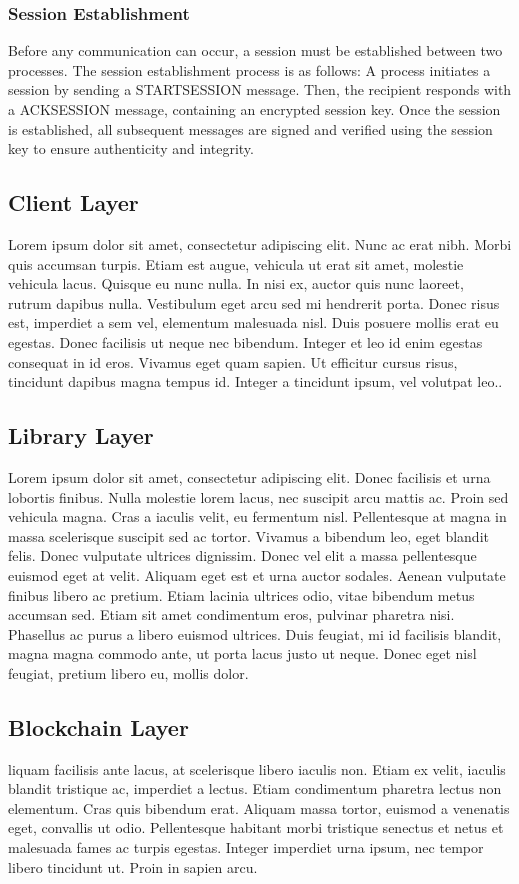 \documentclass[runningheads]{llncs}
\begin{document}
\subsubsection{Session Establishment}

Before any communication can occur, a session must be established between two
processes. The session establishment process is as follows: A process initiates
a session by sending a STARTSESSION message. Then, the recipient responds with a
ACKSESSION message, containing an encrypted session key. Once the session is
established, all subsequent messages are signed and verified using the session
key to ensure authenticity and integrity.
%
\subsection{Client Layer}
Lorem ipsum dolor sit amet, consectetur adipiscing elit. Nunc ac erat nibh.
Morbi quis accumsan turpis. Etiam est augue, vehicula ut erat sit amet, molestie
vehicula lacus. Quisque eu nunc nulla. In nisi ex, auctor quis nunc laoreet,
rutrum dapibus nulla. Vestibulum eget arcu sed mi hendrerit porta. Donec risus
est, imperdiet a sem vel, elementum malesuada nisl. Duis posuere mollis erat eu
egestas. Donec facilisis ut neque nec bibendum. Integer et leo id enim egestas
consequat in id eros. Vivamus eget quam sapien. Ut efficitur cursus risus,
tincidunt dapibus magna tempus id. Integer a tincidunt ipsum, vel volutpat leo..
%
\subsection{Library Layer}
Lorem ipsum dolor sit amet, consectetur adipiscing elit. Donec facilisis et urna
lobortis finibus. Nulla molestie lorem lacus, nec suscipit arcu mattis ac. Proin
sed vehicula magna. Cras a iaculis velit, eu fermentum nisl. Pellentesque at
magna in massa scelerisque suscipit sed ac tortor. Vivamus a bibendum leo, eget
blandit felis. Donec vulputate ultrices dignissim. Donec vel elit a massa
pellentesque euismod eget at velit. Aliquam eget est et urna auctor sodales.
Aenean vulputate finibus libero ac pretium. Etiam lacinia ultrices odio, vitae
bibendum metus accumsan sed. Etiam sit amet condimentum eros, pulvinar pharetra
nisi. Phasellus ac purus a libero euismod ultrices. Duis feugiat, mi id
facilisis blandit, magna magna commodo ante, ut porta lacus justo ut neque.
Donec eget nisl feugiat, pretium libero eu, mollis dolor.
%
\subsection{Blockchain Layer}
liquam facilisis ante lacus, at scelerisque libero iaculis non. Etiam ex velit,
iaculis blandit tristique ac, imperdiet a lectus. Etiam condimentum pharetra
lectus non elementum. Cras quis bibendum erat. Aliquam massa tortor, euismod a
venenatis eget, convallis ut odio. Pellentesque habitant morbi tristique
senectus et netus et malesuada fames ac turpis egestas. Integer imperdiet urna
ipsum, nec tempor libero tincidunt ut. Proin in sapien arcu.
%
\end{document}
